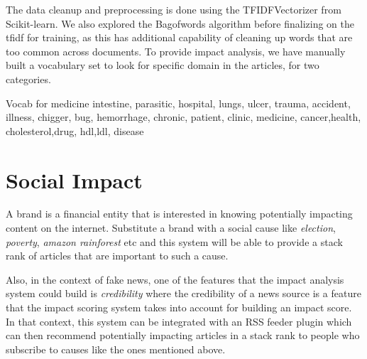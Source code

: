 \documentclass{article}
\begin{document}
The data cleanup and preprocessing is done using the TFIDFVectorizer from Scikit-learn.
We also explored the Bagofwords algorithm before finalizing on the tfidf for training, as this has additional capability of cleaning up words that are too common across documents.
To provide impact analysis, we have manually built a vocabulary set to look for specific domain in the articles, for two categories.


Vocab for medicine
intestine, parasitic, hospital, lungs, ulcer, trauma, accident, illness, chigger, bug, hemorrhage, chronic, patient, clinic, medicine, cancer,health, cholesterol,drug, hdl,ldl, disease
\maketitle %


\section*{Social Impact} %
A brand is a financial entity that is interested in knowing potentially impacting content on the internet. Substitute a brand with a social cause like \textit{election}, \textit{poverty}, \textit{amazon rainforest} etc and this system will be able to provide a stack rank of articles that are important to such a cause. 

Also, in the context of fake news, one of the features that the impact analysis system could build is \textit{credibility} where the credibility of a news source is a feature that the impact scoring system takes into account for building an impact score. In that context, this system can be integrated with an RSS feeder plugin which can then recommend potentially impacting articles in a stack rank to people who subscribe to causes like the ones mentioned above.
\end{document}
